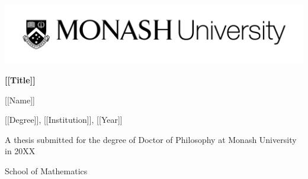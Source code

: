 \begin{titlepage}
  \begin{center}
    
    {
      \includegraphics[width=\textwidth]{img/monash-logo-line}
    }

    \vspace{\fill}

      { %
      \textbf{
        \large
        [[Title]]
        }
      }

      \vspace{0.1cm}

    {
      \large
      [[Name]]

      \vspace{.1cm}

      \normalsize
      [[Degree]], [[Institution]], [[Year]]
    }

    \vspace{\fill}

    {
      A thesis submitted for the degree of Doctor of Philosophy at Monash
      University in 20XX
    }


    {
      School of Mathematics
    }

    \vspace*{\fill}
  \end{center}
\end{titlepage}

\clearpage
